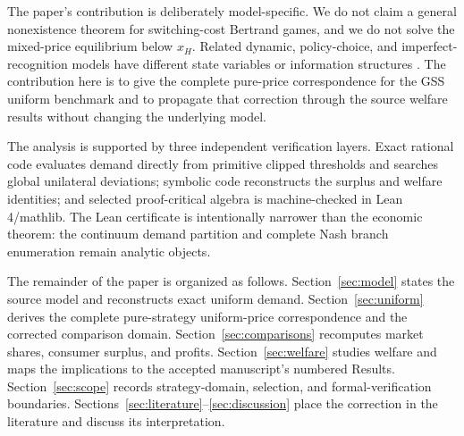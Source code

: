 The paper's contribution is deliberately model-specific. We do not claim a general nonexistence theorem for switching-cost Bertrand games, and we do not solve the mixed-price equilibrium below \(x_H\). Related dynamic, policy-choice, and imperfect-recognition models have different state variables or information structures \citep{JeongMaruyama2008,FabraGarcia2015,ColomboGrazianoPignataro2024}. The contribution here is to give the complete pure-price correspondence for the GSS uniform benchmark and to propagate that correction through the source welfare results without changing the underlying model.

The analysis is supported by three independent verification layers. Exact rational code evaluates demand directly from primitive clipped thresholds and searches global unilateral deviations; symbolic code reconstructs the surplus and welfare identities; and selected proof-critical algebra is machine-checked in Lean 4/mathlib. The Lean certificate is intentionally narrower than the economic theorem: the continuum demand partition and complete Nash branch enumeration remain analytic objects.

The remainder of the paper is organized as follows. Section~\ref{sec:model} states the source model and reconstructs exact uniform demand. Section~\ref{sec:uniform} derives the complete pure-strategy uniform-price correspondence and the corrected comparison domain. Section~\ref{sec:comparisons} recomputes market shares, consumer surplus, and profits. Section~\ref{sec:welfare} studies welfare and maps the implications to the accepted manuscript's numbered Results. Section~\ref{sec:scope} records strategy-domain, selection, and formal-verification boundaries. Sections~\ref{sec:literature}--\ref{sec:discussion} place the correction in the literature and discuss its interpretation.
